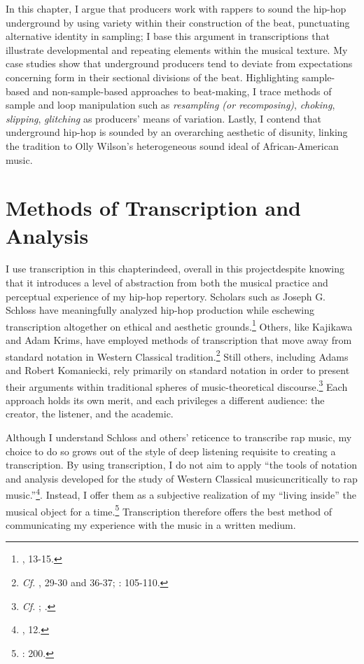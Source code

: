 In this chapter, I argue that producers work with rappers to sound the hip-hop underground by using variety within their construction of the beat, punctuating alternative identity in sampling; I base this argument in transcriptions that illustrate developmental and repeating elements within the musical texture. My case studies show that underground producers tend to deviate from expectations concerning form in their sectional divisions of the beat. Highlighting sample-based and non-sample-based approaches to beat-making, I trace methods of sample and loop manipulation such as \emph{resampling (or recomposing)}, \emph{choking}, \emph{slipping}, \emph{glitching} as producers' means of variation. Lastly, I contend that underground hip-hop is sounded by an overarching aesthetic of disunity, linking the tradition to Olly Wilson's heterogeneous sound ideal of African-American music.

\section{Methods of Transcription and Analysis}
I use transcription in this chapter\textemdash indeed, overall in this project\textemdash despite knowing that it introduces a level of abstraction from both the musical practice and perceptual experience of my hip-hop repertory. Scholars such as Joseph G. Schloss have meaningfully analyzed hip-hop production while eschewing transcription altogether on ethical and aesthetic grounds.\footnote{\cite{josephgschlossMakingBeatsArt2004}, 13-15.} Others, like Kajikawa and Adam Krims, have employed methods of transcription that move away from standard notation in Western Classical tradition.\footnote{\textit{Cf.} \cite{lorenkajikawaSoundingRaceRap2015}, 29-30 and 36-37; \cite{adamkrimsRapMusicPoetics2000}: 105-110.} Still others, including Adams and Robert Komaniecki, rely primarily on standard notation in order to present their arguments within traditional spheres of music-theoretical discourse.\footnote{\textit{Cf. }\cite{kyleadamsMetricalTechniquesFlow2009}; \cite{robertkomanieckiAnalyzingCollaborativeFlow2017}.} Each approach holds its own merit, and each privileges a different audience: the creator, the listener, and the academic.

Although I understand Schloss and others' reticence to transcribe rap music, my choice to do so grows out of the style of deep listening requisite to creating a transcription. By using transcription, I do not aim to apply ``the tools of notation and analysis developed for the study of Western Classical music\textellipsis uncritically to rap music.''\footnote{\cite{lorenkajikawaSoundingRaceRap2015}, 12.}. Instead, I offer them as a subjective realization of my ``living inside'' the musical object for a time.\footnote{\cite{peterwinklerWritingGhostNotes1997}: 200.} Transcription therefore offers the best method of communicating my experience with the music in a written medium.

